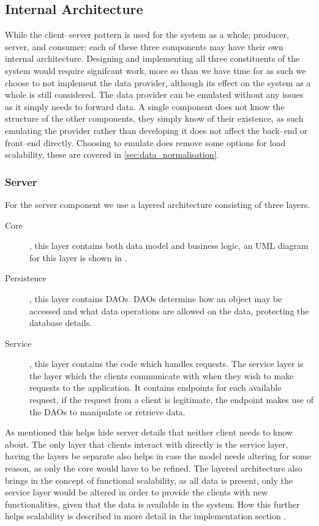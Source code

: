 \subsection{Internal Architecture}
While the client--server pattern is used for the system as a whole; producer, server, and consumer; each of these three components may have their own internal architecture.
Designing and implementing all three constituents of the system would require signifcant work, more so than we have time for as such we choose to not implement the data provider, although its effect on the system as a whole is still considered.
The data provider can be emulated without any issues as it simply needs to forward data.
A single component does not know the structure of the other components, they simply know of their existence, as such emulating the provider rather than developing it does not affect the back--end or front--end directly.
Choosing to emulate does remove some options for load scalability, these are covered in \cref{sec:data_normalisation}.

\subsubsection{Server}
For the server component we use a layered architecture consisting of three layers.
\begin{description}
    \item [Core], this layer contains both data model and business logic, an UML diagram for this layer is shown in .
    \item [Persistence], this layer contains \aclp{DAO}.
    \acsp{DAO} determine how an object may be accessed and what data operations are allowed on the data, protecting the database details.
    \item [Service], this layer contains the code which handles requests.
    The service layer is the layer which the clients communicate with when they wish to make requests to the application.
    It contains endpoints for each available request, if the request from a client is legitimate, the endpoint makes use of the \acsp{DAO} to manipulate or retrieve data.
\end{description}
As mentioned this helps hide server details that neither client needs to know about.
The only layer that clients interact with directly is the service layer, having the layers be separate also helps in case the model needs altering for some reason, as only the core would have to be refined.
The layered architecture also brings in the concept of functional scalability, as all data is present, only the service layer would be altered in order to provide the clients with new functionalities, given that the data is available in the system.
How this further helps scalability is described in more detail in the implementation section .

